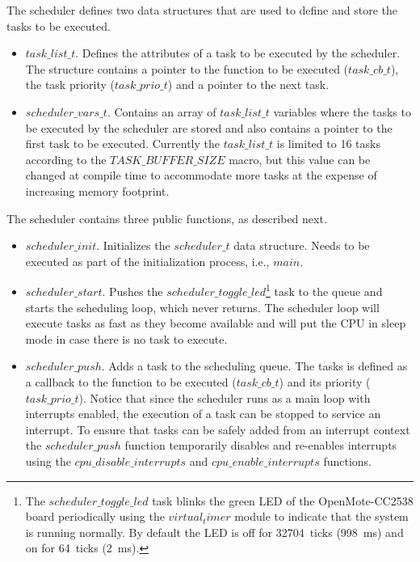 The scheduler defines two data structures that are used to define and store the tasks to be executed.
\begin{itemize}
\item $task\_list\_t$. Defines the attributes of a task to be executed by the scheduler. The structure contains a pointer to the function to be executed ($task\_cb\_t$), the task priority ($task\_prio\_t$) and a pointer to the next task.
\item $scheduler\_vars\_t$. Contains an array of $task\_list\_t$ variables where the tasks to be executed by the scheduler are stored and also contains a pointer to the first task to be executed. Currently the $task\_list\_t$ is limited to 16 tasks according to the $TASK\_BUFFER\_SIZE$ macro, but this value can be changed at compile time to accommodate more tasks at the expense of increasing memory footprint.
\end{itemize}

The scheduler contains three public functions, as described next.
\begin{itemize}
\item $scheduler\_init$. Initializes the $scheduler\_t$ data structure. Needs to be executed as part of the initialization process, i.e., $main$. 
\item $scheduler\_start$. Pushes the $scheduler\_toggle\_led$\footnote{The $scheduler\_toggle\_led$ task blinks the green LED of the OpenMote-CC2538 board periodically using the $virtual_timer$ module to indicate that the system is running normally. By default the LED is off for 32704~ticks (998~ms) and on for 64~ticks (2~ms).} task to the queue and starts the scheduling loop, which never returns. The scheduler loop will execute tasks as fast as they become available and will put the CPU in sleep mode in case there is no task to execute. 
\item $scheduler\_push$. Adds a task to the scheduling queue. The tasks is defined as a callback to the function to be executed ($task\_cb\_t$) and its priority ($task\_prio\_t$). Notice that since the scheduler runs as a main loop with interrupts enabled, the execution of a task can be stopped to service an interrupt. To ensure that tasks can be safely added from an interrupt context the $scheduler\_push$ function temporarily disables and re-enables interrupts using the $cpu\_disable\_interrupts$ and $cpu\_enable\_interrupts$ functions.
\end{itemize}

